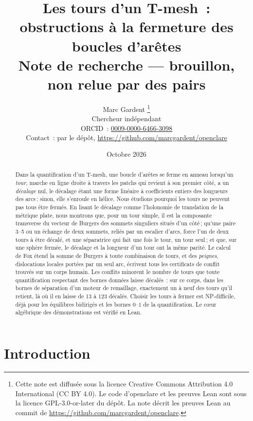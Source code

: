 \documentclass[11pt,a4paper]{article}
\title{Les tours d'un T-mesh~:\\
obstructions à la fermeture des boucles d'arêtes\\[0.5em]
\large Note de recherche --- brouillon, non relue par des pairs}
\author{Marc Gardent%
\thanks{Cette note est diffusée sous la licence Creative Commons Attribution
4.0 International (CC BY 4.0). Le code d'openclare et les preuves Lean sont
sous la licence GPL-3.0-or-later du dépôt. La note décrit les preuves Lean au
commit \texttt{\enginecommit} de
\url{https://github.com/marcgardent/openclare}.}\\
\normalsize Chercheur indépendant\\
\normalsize ORCID~: \href{https://orcid.org/0009-0000-6466-3098}{0009-0000-6466-3098}\\
\normalsize Contact~: par le dépôt,
\url{https://github.com/marcgardent/openclare}}
\date{Octobre 2026}
\begin{document}
\maketitle

\begin{center}
\end{center}

\begin{abstract}
Dans la quantification d'un T-mesh, une boucle d'arêtes se ferme en anneau
lorsqu'un \emph{tour}, marche en ligne droite à travers les patchs qui revient
à son premier côté, a un \emph{décalage} nul, le décalage étant une forme
linéaire à coefficients entiers des longueurs des arcs\,; sinon, elle
s'enroule en hélice. Nous étudions pourquoi les tours ne peuvent pas tous être
fermés. En lisant le décalage comme l'holonomie de translation de la métrique
plate, nous montrons que, pour un tour simple, il est la composante transverse
du vecteur de Burgers des sommets singuliers situés d'un côté\,; qu'une paire
3--5 ou un échange de deux sommets, reliés par un escalier d'arcs, force l'un
de deux tours à être décalé, et une séparatrice qui fait une fois le tour, un
tour seul\,; et que, sur une sphère fermée, le décalage et la longueur d'un
tour ont la même parité. Le calcul de Fox étend la somme de Burgers à toute
combinaison de tours, et des \emph{peignes}, dislocations locales portées par
un seul arc, écrivent tous les certificats de conflit trouvés sur un corps
humain. Les conflits minorent le nombre de tours que toute quantification
respectant des bornes données laisse décalés~: sur ce corps, dans les bornes
de séparation d'un moteur de remaillage, exactement un à neuf des tours qu'il
retient, là où il en laisse de 13 à 123 décalés. Choisir les tours à fermer
est NP-difficile, déjà pour les équilibres bidirigés et les bornes $0$--$1$ de
la quantification. Le cœur algébrique des démonstrations est vérifié en Lean.
\end{abstract}

\section{Introduction}
\end{document}
